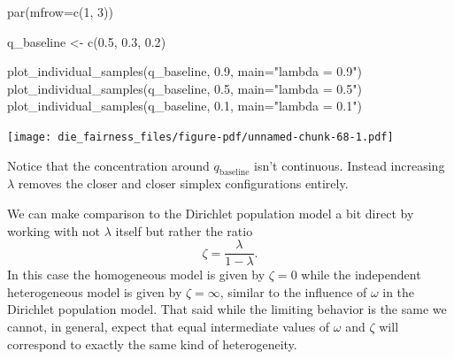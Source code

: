 \documentclass[
  letterpaper,
  DIV=11,
  numbers=noendperiod]{scrartcl}
\newenvironment{Shaded}{\begin{snugshade}}{\end{snugshade}}
\newcommand{\AttributeTok}[1]{\textcolor[rgb]{0.40,0.45,0.13}{#1}}
\newcommand{\ConstantTok}[1]{\textcolor[rgb]{0.56,0.35,0.01}{#1}}
\newcommand{\DecValTok}[1]{\textcolor[rgb]{0.68,0.00,0.00}{#1}}
\newcommand{\FloatTok}[1]{\textcolor[rgb]{0.68,0.00,0.00}{#1}}
\newcommand{\FunctionTok}[1]{\textcolor[rgb]{0.28,0.35,0.67}{#1}}
\newcommand{\NormalTok}[1]{\textcolor[rgb]{0.00,0.23,0.31}{#1}}
\newcommand{\OtherTok}[1]{\textcolor[rgb]{0.00,0.23,0.31}{#1}}
\newcommand{\SpecialCharTok}[1]{\textcolor[rgb]{0.37,0.37,0.37}{#1}}
\newcommand{\StringTok}[1]{\textcolor[rgb]{0.13,0.47,0.30}{#1}}
\begin{document}
\begin{Shaded}
\end{Shaded}

\begin{Shaded}
\begin{Highlighting}[]
\FunctionTok{par}\NormalTok{(}\AttributeTok{mfrow=}\FunctionTok{c}\NormalTok{(}\DecValTok{1}\NormalTok{, }\DecValTok{3}\NormalTok{))}

\NormalTok{q\_baseline }\OtherTok{\textless{}{-}} \FunctionTok{c}\NormalTok{(}\FloatTok{0.5}\NormalTok{, }\FloatTok{0.3}\NormalTok{, }\FloatTok{0.2}\NormalTok{)}

\FunctionTok{plot\_individual\_samples}\NormalTok{(q\_baseline, }\FloatTok{0.9}\NormalTok{, }\AttributeTok{main=}\StringTok{"lambda = 0.9"}\NormalTok{)}
\FunctionTok{plot\_individual\_samples}\NormalTok{(q\_baseline, }\FloatTok{0.5}\NormalTok{, }\AttributeTok{main=}\StringTok{"lambda = 0.5"}\NormalTok{)}
\FunctionTok{plot\_individual\_samples}\NormalTok{(q\_baseline, }\FloatTok{0.1}\NormalTok{, }\AttributeTok{main=}\StringTok{"lambda = 0.1"}\NormalTok{)}
\end{Highlighting}
\end{Shaded}

\texttt{[image: die\_fairness\_files/figure-pdf/unnamed-chunk-68-1.pdf]}

Notice that the concentration around \(q_{\mathrm{baseline}}\) isn't
continuous. Instead increasing \(\lambda\) removes the closer and closer
simplex configurations entirely.

We can make comparison to the Dirichlet population model a bit direct by
working with not \(\lambda\) itself but rather the ratio \[
\zeta = \frac{ \lambda }{ 1 - \lambda }.
\] In this case the homogeneous model is given by \(\zeta = 0\) while
the independent heterogeneous model is given by \(\zeta = \infty\),
similar to the influence of \(\omega\) in the Dirichlet population
model. That said while the limiting behavior is the same we cannot, in
general, expect that equal intermediate values of \(\omega\) and
\(\zeta\) will correspond to exactly the same kind of heterogeneity.
\end{document}
